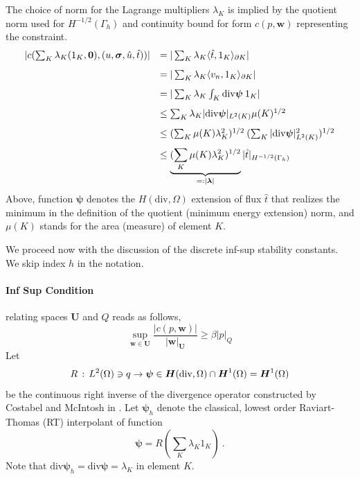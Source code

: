 \documentclass[letterpaper]{article}
\newcommand{\ptl}{{\partial}}
\newcommand{\bfsig}{\mbox{\boldmath $\sigma$}}
\newcommand{\bfU}{\boldsymbol U}
\newcommand{\bfw}{\boldsymbol w}
\newcommand{\bfpsi}{\boldsymbol\psi}
\newcommand{\bflambda}{\boldsymbol\lambda}
\newcommand{\bfH}{\mbox{\boldmath $H$}}
\begin{document}
The choice of norm for the Lagrange multipliers $\lambda_K$ is implied
by the quotient norm used for $H^{-1/2}(\Gamma_h)$ and continuity
bound for form $c(p,\bfw)$ representing the constraint.
\begin{equation}
\begin{array}{lll}
| c(\sum_K \lambda_K (1_K,{\bf 0}),(u,\bfsig,\hat{u},\hat{t})) |
& = | \sum_K \lambda_K \langle \hat{t}, 1_K \rangle_{\ptl K} | \\[8pt]
& = | \sum_K \lambda_K \langle v_n , 1_K \rangle_{\ptl K} | \\[8pt]
& = | \sum_K \lambda_K \int_K \text{div} \bfpsi \: 1_K  | \\[8pt]
& \leq \sum_K  \lambda_K | \text{div} \bfpsi |_{L^2(K)} \mu(K)^{1/2} \\[8pt]
& \leq (\sum_K \mu(K) \lambda_K^2)^{1/2} \: (\sum_K | \text{div} \bfpsi |_{L^2(K)}^2 )^{1/2} \\[8pt]
& \leq \underbrace{(\sum_K \mu(K) \lambda_K^2)^{1/2}}_{=: | \bflambda |} | \hat{t} |_{H^{-1/2}(\Gamma_h)}
\end{array}
\end{equation}
Above, function $\bfpsi$ denotes the $H(\text{div},\Omega)$ extension of flux $\hat{t}$
that realizes the minimum in the definition of the quotient (minimum energy extension) norm,
and $\mu(K)$ stands for the area (measure) of element $K$.

We proceed now with the discussion of the discrete inf-sup stability constants. We skip
index $h$ in the notation.

\paragraph{Inf Sup Condition} relating spaces $\bfU$ and $Q$ reads as follows,
\begin{equation}
   \sup_{\bfw \in \bfU} \frac{| c(p,\bfw) |}{| \bfw |_{\bfU}} \geq \beta | p |_Q
\end{equation}
Let
\begin{equation}
R\, : \, L^2(\Omega) \ni q \to \bfpsi \in \bfH(\text{div},\Omega) \cap \bfH^1(\Omega)
=\bfH^1(\Omega)
\end{equation}
be
the continuous right inverse of the divergence operator constructed by
Costabel and McIntosh in \cite{CostabelMcIntosh}.
Let $\bfpsi_h$ denote the classical, lowest order Raviart-Thomas (RT) interpolant of
function
\begin{equation}
\bfpsi = R (\sum_K \lambda_K 1_K) \: .
\end{equation}
Note that $\text{div} \bfpsi_h = \text{div} \bfpsi = \lambda_K$ in element $K$.
\end{document}
